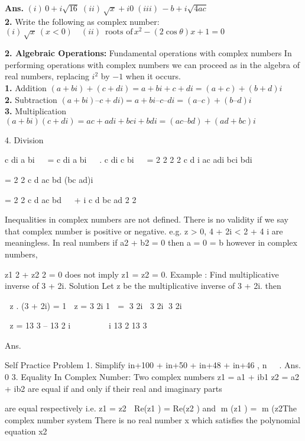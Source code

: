 \documentclass[a4paper,10.5pt,fleqn]{article}
\begin{document}
\textbf{Ans.} $(i)\, 0 + i \sqrt{16}\; (ii)\, \sqrt{x}  + i0\; (iii)\, -b + i\sqrt{4ac}$\\

\textbf{2.} Write the following as complex number:\\

$(i)\,\sqrt{x}\,  (x < 0) \quad(ii)\, \text{ roots of}\, x^2- (2\cos\theta)x + 1 = 0$

\textbf{2. Algebraic Operations:}
Fundamental operations with complex numbers
In performing operations with complex numbers we can proceed as in the algebra of real numbers,
replacing $i^2$ by $-1$ when it occurs.\\

\textbf{1. } Addition $(a + bi) + (c + di) = a + bi + c + di = (a + c) + (b + d) i$\\
\textbf{2. }Subtraction $(a + bi) – c + di) = a + bi – c – di = (a – c) + (b – d) i$\\
\textbf{3.} Multiplication $(a + bi) (c + di) = ac + adi + bci + bdi= (ac – bd) + (ad+ bc)i$

4. Division

c di
a bi


=
c di
a bi


.
c di
c bi


= 2 2 2
2
c d i
ac adi bci bdi

  

= 2 2
c d
ac bd (bc ad)i

  

= 2 2
c d
ac bd


+ i
c d
bc ad
2 2



Inequalities in complex numbers are not defined. There is no validity if we say that complex number is
positive or negative.
e.g. z > 0, 4 + 2i < 2 + 4 i are meaningless.
In real numbers if a2
+ b2
= 0 then a = 0 = b however in complex numbers,

z1
2
+ z2
2
= 0 does not imply z1
= z2
= 0.
Example : Find multiplicative inverse of 3 + 2i.
Solution Let z be the multiplicative inverse of 3 + 2i. then

 z . (3 + 2i) = 1
 z = 3 2i
1

= 3 2i 3 2i
3 2i
 


 z = 13
3
– 13
2
i






 i
13
2
13
3

Ans.

Self Practice Problem
1. Simplify in+100 + in+50 + in+48 + in+46 , n  .
Ans. 0
3. Equality In Complex Number:
Two complex numbers z1
= a1 + ib1
 z2
= a2 + ib2
are equal if and only if their real and imaginary parts

are equal respectively
i.e. z1
= z2  Re(z1
) = Re(z2
) and m
(z1
) = m
(z2The complex number system
There is no real number x which satisfies the polynomial equation x2
\end{document}
